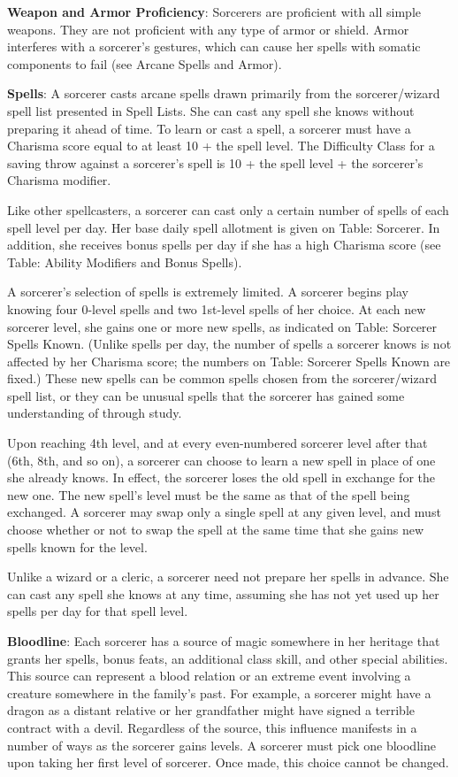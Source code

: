 \textbf{Weapon and Armor Proficiency}: Sorcerers are proficient with all simple weapons. They are not proficient 
with any type of armor or shield. Armor interferes with a sorcerer's gestures, which can cause her spells with
somatic components to fail (see Arcane Spells and Armor).
				
\textbf{Spells}: A sorcerer casts arcane spells drawn primarily from the sorcerer/wizard spell list presented in 
Spell Lists. She can cast any spell she knows without preparing it ahead of time. To learn or cast a spell, a 
sorcerer must have a Charisma score equal to at least 10 + the spell level. The Difficulty Class for a saving 
throw against a sorcerer's spell is 10 + the spell level + the sorcerer's Charisma modifier.
				
Like other spellcasters, a sorcerer can cast only a certain number of spells of each spell level per day. Her
base daily spell allotment is given on Table: Sorcerer. In addition, she receives bonus spells per day if she 
has a high Charisma score (see Table: Ability Modifiers and Bonus Spells).
				
A sorcerer's selection of spells is extremely limited. A sorcerer begins play knowing four 0-level spells and 
two 1st-level spells of her choice. At each new sorcerer level, she gains one or more new spells, as indicated 
on Table: Sorcerer Spells Known. (Unlike spells per day, the number of spells a sorcerer knows is not affected 
by her Charisma score; the numbers on Table: Sorcerer Spells Known are fixed.) These new spells can be common 
spells chosen from the sorcerer/wizard spell list, or they can be unusual spells that the sorcerer has gained 
some understanding of through study. 
				
Upon reaching 4th level, and at every even-numbered sorcerer level after that (6th, 8th, and so on), a sorcerer
can choose to learn a new spell in place of one she already knows. In effect, the sorcerer loses the old spell 
in exchange for the new one. The new spell's level must be the same as that of the spell being exchanged. A 
sorcerer may swap only a single spell at any given level, and must choose whether or not to swap the spell at
the same time that she gains new spells known for the level.
				
Unlike a wizard or a cleric, a sorcerer need not prepare her spells in advance. She can cast any spell she knows
at any time, assuming she has not yet used up her spells per day for that spell level.
				
\textbf{Bloodline}: Each sorcerer has a source of magic somewhere in her heritage that grants her spells, bonus
feats, an additional class skill, and other special abilities. This source can represent a blood relation or an
extreme event involving a creature somewhere in the family's past. For example, a sorcerer might have a dragon 
as a distant relative or her grandfather might have signed a terrible contract with a devil. Regardless of the 
source, this influence manifests in a number of ways as the sorcerer gains levels. A sorcerer must pick one 
bloodline upon taking her first level of sorcerer. Once made, this choice cannot be changed.
				
